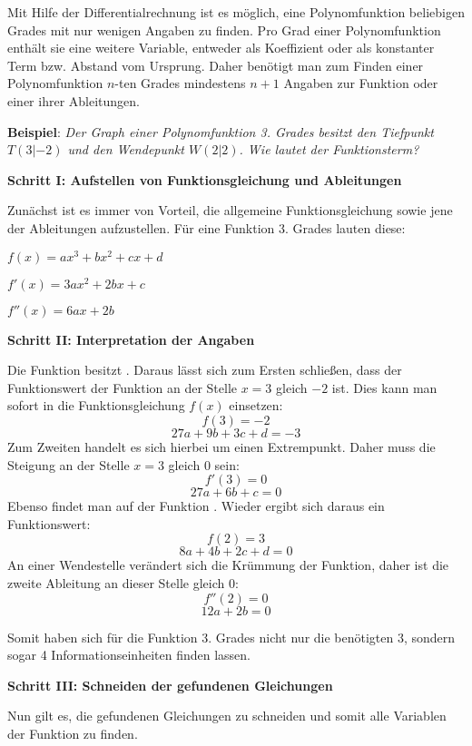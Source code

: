 
Mit Hilfe der Differentialrechnung ist es m\"{o}glich, eine Polynomfunktion beliebigen Grades mit nur wenigen Angaben zu finden. Pro Grad einer Polynomfunktion enth\"{a}lt sie eine weitere Variable, entweder als Koeffizient oder als konstanter Term bzw. Abstand vom Ursprung. Daher ben\"{o}tigt man zum Finden einer Polynomfunktion $n$-ten Grades mindestens $n + 1$ Angaben zur Funktion oder einer ihrer Ableitungen.

\textbf{Beispiel}: \emph{Der Graph einer Polynomfunktion 3. Grades besitzt den Tiefpunkt $T(3|-2)$ und den Wendepunkt $W(2|2)$. Wie lautet der Funktionsterm?}

\textbf{Schritt I: Aufstellen von Funktionsgleichung und Ableitungen}

Zun\"{a}chst ist es immer von Vorteil, die allgemeine Funktionsgleichung sowie jene der Ableitungen aufzustellen. F\"{u}r eine Funktion 3. Grades lauten diese:

$f(x) = ax^3 + bx^2 + cx + d$

$f'(x) = 3ax^2 + 2bx + c$

$f''(x) = 6ax + 2b$

\textbf{Schritt II: Interpretation der Angaben}

Die Funktion besitzt . Daraus l\"{a}sst sich zum Ersten schlie\ss{}en, dass der Funktionswert der Funktion an der Stelle $x = 3$ gleich $-2$ ist. Dies kann man sofort in die Funktionsgleichung $f(x)$ einsetzen: $$f(3) = -2$$ $$27a + 9b + 3c + d = -3$$ Zum Zweiten handelt es sich hierbei um einen Extrempunkt. Daher muss die Steigung an der Stelle $x = 3$ gleich $0$ sein: $$f'(3) = 0$$ $$27a + 6b + c = 0$$ Ebenso findet man auf der Funktion . Wieder ergibt sich daraus ein Funktionswert: $$f(2) = 3$$ $$8a + 4b + 2c + d = 0$$ An einer Wendestelle ver\"{a}ndert sich die Kr\"{u}mmung der Funktion, daher ist die zweite Ableitung an dieser Stelle gleich 0: $$f''(2) = 0$$ $$12a + 2b = 0$$

Somit haben sich f\"{u}r die Funktion 3. Grades nicht nur die ben\"{o}tigten 3, sondern sogar 4 Informationseinheiten finden lassen.

\pagebreak

\textbf{Schritt III: Schneiden der gefundenen Gleichungen}

Nun gilt es, die gefundenen Gleichungen zu schneiden und somit alle Variablen der Funktion zu finden.

